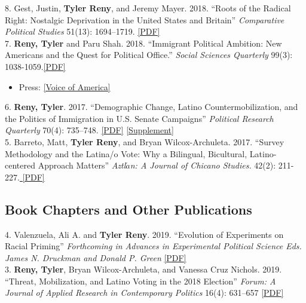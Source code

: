 \documentclass[11pt, a4paper]{article}
\newcommand{\years}[1]{\marginnote{\scriptsize #1}}
\begin{document}
\years{} 8. Gest, Justin, \textbf{Tyler Reny}, and Jeremy Mayer. 2018. ``Roots of the Radical Right: Nostalgic Deprivation in the United States and Britain'' \textit{Comparative Political Studies} 51(13): 1694–1719. \href{http://tylerreny.github.io/pdf/pubs/reny_2017_cps_final.pdf}{[PDF]}\\

\years{} 7. \textbf{Reny, Tyler} and Paru Shah. 2018. ``Immigrant Political Ambition:  New Americans and the Quest for Political Office.'' \textit{Social Sciences Quarterly} 99(3): 1038-1059.\href{http://tylerreny.github.io/pdf/pubs/reny_shah_2018_ssq_immigrant_ambition.pdf}{[PDF]} 

\begin{itemize}
\item Press: \href{https://www.voanews.com/a/immigrants-candidates-make-a-run-for-it-in-upcoming-us-elections/4439132.html}{[Voice of America]}
\end{itemize}

\years{2017} 6. \textbf{Reny, Tyler}. 2017. ``Demographic Change, Latino Countermobilization, and the Politics of Immigration in U.S. Senate Campaigns'' \textit{Political Research Quarterly} 70(4): 735–748. \href{http://tylerreny.github.io/pdf/pubs/reny_2017_prq_final.pdf}{[PDF]} \href{http://tylerreny.github.io/pdf/pubs/reny_2017_prq_final_supp.pdf}{[Supplement]}\\

\years{} 5. Barreto, Matt, \textbf{Tyler Reny}, and Bryan Wilcox-Archuleta. 2017. ``Survey Methodology and the Latina/o Vote: Why a Bilingual, Bicultural, Latino-centered Approach Matters'' \textit{Aztl$\acute{a}$n: A Journal of Chicano Studies.} 42(2): 211-227.\href{http://tylerreny.github.io/pdf/pubs/reny_2017_aztlan_final.pdf}{ [PDF]}\\

\subsection*{Book Chapters and Other Publications}

\years{2019} 4. Valenzuela, Ali A. and \textbf{Tyler Reny}. 2019. ``Evolution of Experiments on Racial Priming''  \textit{Forthcoming in Advances in Experimental Political Science Eds. James N. Druckman and Donald P. Green} \href{http://tylerreny.github.io/pdf/pubs/ValenzuelaReny_racial_priming_cambridge_handbook.pdf}{[PDF]}\\

\years{} 3. \textbf{Reny, Tyler}, Bryan Wilcox-Archuleta, and Vanessa Cruz Nichols. 2019. ``Threat, Mobilization, and Latino Voting in the 2018 Election''  \textit{Forum: A Journal of Applied Research in Contemporary Politics} 16(4): 631–657 \href{http://tylerreny.github.io/pdf/pubs/reny_wilcox_cruz_nichols2019.pdf}{[PDF]} \\
\end{document}
